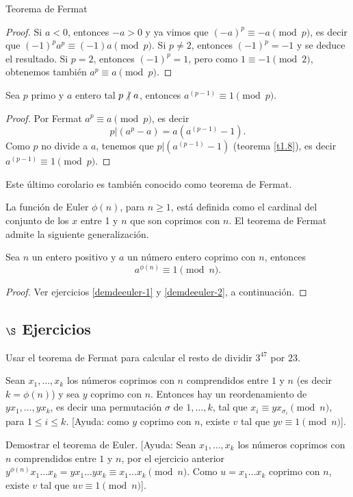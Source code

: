 \begin{section}{Teorema de Fermat}
\begin{proof}
Si $a<0$, entonces $-a>0$ y ya vimos que $(-a)^p \equiv -a
\pmod{p}$, es decir que $(-1)^pa^p \equiv (-1)a \pmod{p}$. Si
$p\not=2$, entonces $(-1)^p=-1$ y se deduce el resultado. Si
$p=2$, entonces $(-1)^p=1$, pero como $1\equiv -1 \pmod{2}$,
obtenemos también $a^p\equiv a\pmod{p}$.
\end{proof}

\begin{corolario}
    Sea $p$ primo y  $a$ entero tal $p\operatorname{\not|\,} a$, entonces $a^{(p-1)}\equiv 1\pmod{p}$.
\end{corolario}
\begin{proof}
    Por Fermat $a^p\equiv a\pmod{p}$, es decir 
    $$p|(a^p -a)=a(a^{(p-1)} -1).$$
    Como $p$ no divide a $a$, tenemos que $p|(a^{(p-1)} -1)$ (teorema \ref{t1.8}), es decir  $a^{(p-1)}\equiv 1\pmod{p}$.
\end{proof}

Este último corolario es también conocido como teorema de Fermat.



La función de Euler   $\phi(n)$, para $n\ge 1$, está definida como el cardinal del conjunto de los $x$ entre 1 y $n$ que son coprimos con $n$. El teorema de Fermat admite la siguiente generalización.

\begin{teorema}
    Sea $n$ un entero positivo y $a$ un número entero coprimo con $n$, entonces
$$
a^{\phi(n)} \equiv 1\pmod{n}.
$$
\end{teorema}
\begin{proof}
    Ver ejercicios \ref{demdeeuler-1} y \ref{demdeeuler-2}, a continuación.
\end{proof}

\subsection*{$\S$ Ejercicios}

\begin{enumex}
\item Usar el teorema de Fermat para calcular el resto de dividir
$3^{47}$ por $23$.

\item \label{demdeeuler-1} Sean $x_1,\ldots,x_k$ los números coprimos con $n$ comprendidos
entre $1$ y $n$ (es decir $k=\phi(n)$) y sea $y$ coprimo con $n$.
Entonces hay un reordenamiento de $yx_1,\ldots,yx_k$, es decir una
permutación $\sigma$ de $1,\ldots,k$, tal que $x_i \equiv
yx_{\sigma_i} \pmod{n}$, para $1\le i \le k$. [Ayuda: como $y$
coprimo con $n$, existe $v$ tal que $yv\equiv 1\pmod{n}$].

\item \label{demdeeuler-2}Demostrar el teorema de Euler. [Ayuda: Sean $x_1,\ldots,x_k$ los
números coprimos con $n$ comprendidos entre $1$ y $n$, por el
ejercicio anterior $y^{\phi(n)}x_1\ldots x_k =yx_1\ldots yx_k
\equiv x_1\ldots x_k \pmod{n}$. Como $u=x_1\ldots x_k$ coprimo con
$n$, existe $v$ tal que $uv\equiv 1\pmod{n}$].
\end{enumex}

\end{section}


